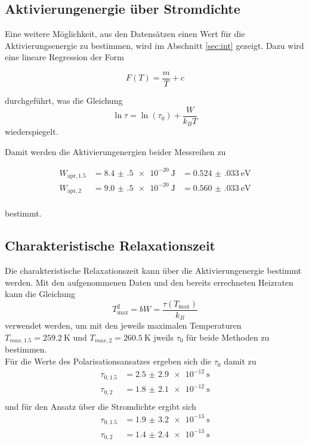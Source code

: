 \subsection{Aktivierungenergie über Stromdichte}

Eine weitere Möglichkeit, aus den Datensätzen einen Wert für die Aktivierungsenergie zu bestimmen, wird im Abschnitt \ref{sec:int} gezeigt. 
Dazu wird eine lineare Regression der Form 

\begin{equation}
    F(T) = \frac{m}{T} + c
\end{equation}

durchgeführt, was die Gleichung 
\begin{equation}
    \ln{\tau} = \ln(\tau_0) + \frac{W}{k_B T}
\end{equation} 
wiederspiegelt.

Damit werden die Aktivierungenergien beider Messreihen zu 

\begin{align*}
    W_{\text{apr},1.5} &= \SI{8.4(5)e-20}{\joule} &= \SI{0.524(033)}{\electronvolt} \\
    W_{\text{apr},2}   &= \SI{9.0(5)e-20}{\joule} &= \SI{0.560(033)}{\electronvolt} \\
\end{align*}

bestimmt.

\subsection{Charakteristische Relaxationszeit}

Die charakteristische Relaxationszeit kann über die Aktivierungenergie bestimmt werden. Mit den aufgenommenen Daten  und den bereits 
errechneten Heizraten kann die Gleichung 
\begin{equation}
    T^2_\text{max} = bW = \frac{\tau(T_\text{max})}{k_B} 
\end{equation} 
verwendet werden, um mit den jeweils maximalen Temperaturen $T_{max,1.5} = \SI{259.2}{\kelvin} $ und $T_{max,2} = \SI{260.5}{\kelvin} $ 
jweils $\tau_0$  für beide Methoden zu bestimmen. \\

Für die Werte des Polarisationsansatzes ergeben sich die $\tau_0$ damit zu 
\begin{align*}
    \tau_{0,1.5} &= \SI{2.5(29)e-12}{\second}\\
    \tau_{0,2}   &= \SI{1.8(21)e-12}{\second}\\ 
\end{align*}
und für den Ansatz über die Stromdichte ergibt sich 
\begin{align*}
    \tau_{0,1.5} &= \SI{1.9(32)e-13}{\second}\\
    \tau_{0,2}   &= \SI{1.4(24)e-13}{\second}\\ 
\end{align*}

